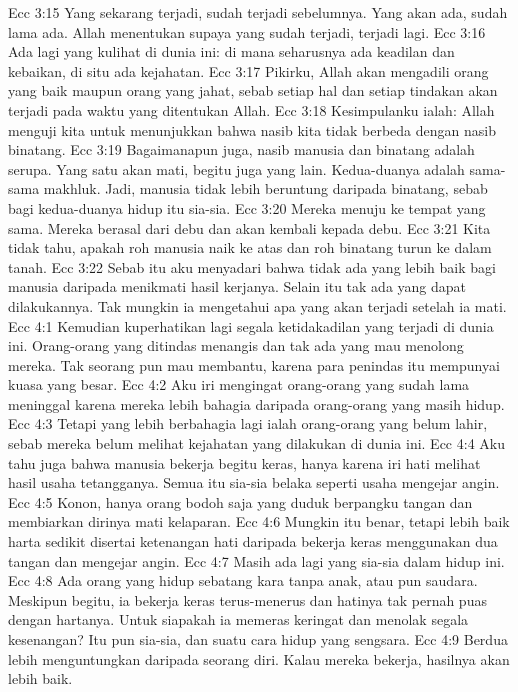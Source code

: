 Ecc 3:15  Yang sekarang terjadi, sudah terjadi sebelumnya. Yang akan ada, sudah lama ada. Allah menentukan supaya yang sudah terjadi, terjadi lagi.
Ecc 3:16  Ada lagi yang kulihat di dunia ini: di mana seharusnya ada keadilan dan kebaikan, di situ ada kejahatan.
Ecc 3:17  Pikirku, Allah akan mengadili orang yang baik maupun orang yang jahat, sebab setiap hal dan setiap tindakan akan terjadi pada waktu yang ditentukan Allah.
Ecc 3:18  Kesimpulanku ialah: Allah menguji kita untuk menunjukkan bahwa nasib kita tidak berbeda dengan nasib binatang.
Ecc 3:19  Bagaimanapun juga, nasib manusia dan binatang adalah serupa. Yang satu akan mati, begitu juga yang lain. Kedua-duanya adalah sama-sama makhluk. Jadi, manusia tidak lebih beruntung daripada binatang, sebab bagi kedua-duanya hidup itu sia-sia.
Ecc 3:20  Mereka menuju ke tempat yang sama. Mereka berasal dari debu dan akan kembali kepada debu.
Ecc 3:21  Kita tidak tahu, apakah roh manusia naik ke atas dan roh binatang turun ke dalam tanah.
Ecc 3:22  Sebab itu aku menyadari bahwa tidak ada yang lebih baik bagi manusia daripada menikmati hasil kerjanya. Selain itu tak ada yang dapat dilakukannya. Tak mungkin ia mengetahui apa yang akan terjadi setelah ia mati.
Ecc 4:1  Kemudian kuperhatikan lagi segala ketidakadilan yang terjadi di dunia ini. Orang-orang yang ditindas menangis dan tak ada yang mau menolong mereka. Tak seorang pun mau membantu, karena para penindas itu mempunyai kuasa yang besar.
Ecc 4:2  Aku iri mengingat orang-orang yang sudah lama meninggal karena mereka lebih bahagia daripada orang-orang yang masih hidup.
Ecc 4:3  Tetapi yang lebih berbahagia lagi ialah orang-orang yang belum lahir, sebab mereka belum melihat kejahatan yang dilakukan di dunia ini.
Ecc 4:4  Aku tahu juga bahwa manusia bekerja begitu keras, hanya karena iri hati melihat hasil usaha tetangganya. Semua itu sia-sia belaka seperti usaha mengejar angin.
Ecc 4:5  Konon, hanya orang bodoh saja yang duduk berpangku tangan dan membiarkan dirinya mati kelaparan.
Ecc 4:6  Mungkin itu benar, tetapi lebih baik harta sedikit disertai ketenangan hati daripada bekerja keras menggunakan dua tangan dan mengejar angin.
Ecc 4:7  Masih ada lagi yang sia-sia dalam hidup ini.
Ecc 4:8  Ada orang yang hidup sebatang kara tanpa anak, atau pun saudara. Meskipun begitu, ia bekerja keras terus-menerus dan hatinya tak pernah puas dengan hartanya. Untuk siapakah ia memeras keringat dan menolak segala kesenangan? Itu pun sia-sia, dan suatu cara hidup yang sengsara.
Ecc 4:9  Berdua lebih menguntungkan daripada seorang diri. Kalau mereka bekerja, hasilnya akan lebih baik.
